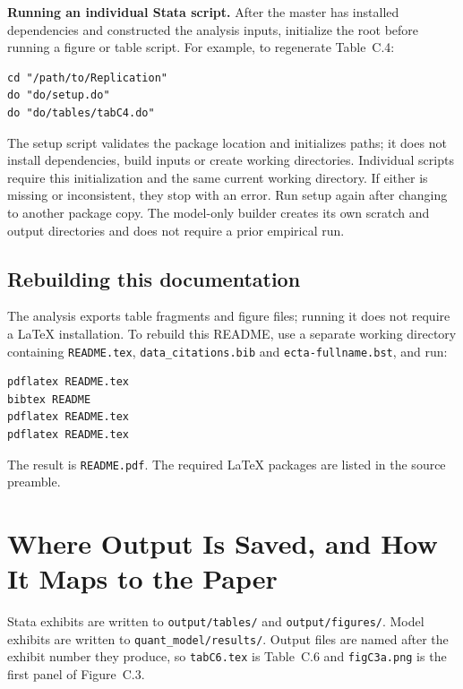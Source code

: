 \documentclass[11pt]{article}
\newcommand{\pkgfile}[1]{\nolinkurl{#1}}
\begin{document}
\noindent\textbf{Running an individual Stata script.}
After the master has installed dependencies and constructed the analysis
inputs, initialize the root before running a figure or table script. For
example, to regenerate Table~C.4:
\begin{Verbatim}
cd "/path/to/Replication"
do "do/setup.do"
do "do/tables/tabC4.do"
\end{Verbatim}
The setup script validates the package location and initializes paths; it
does not install dependencies, build inputs or create working directories.
Individual scripts require this initialization and the same current working
directory. If either is missing or inconsistent, they stop with an error.
Run setup again after changing to another package copy. The model-only
builder creates its own scratch and output directories and does not require
a prior empirical run.




\subsection*{Rebuilding this documentation}
The analysis exports table fragments and figure files; running it does not
require a \LaTeX{} installation. To rebuild this README, use a separate
working directory containing \pkgfile{README.tex},
\pkgfile{data_citations.bib} and \pkgfile{ecta-fullname.bst}, and run:
\begin{Verbatim}[fontsize=\small]
pdflatex README.tex
bibtex README
pdflatex README.tex
pdflatex README.tex
\end{Verbatim}
The result is \pkgfile{README.pdf}. The required \LaTeX{} packages are
listed in the source preamble.

\section{Where Output Is Saved, and How It Maps to the Paper}

Stata exhibits are written to \pkgfile{output/tables/} and
\pkgfile{output/figures/}. Model exhibits are written to
\pkgfile{quant_model/results/}. Output files are named after the exhibit
number they produce, so \pkgfile{tabC6.tex} is Table~C.6 and
\pkgfile{figC3a.png} is the first panel of Figure~C.3.
\end{document}
